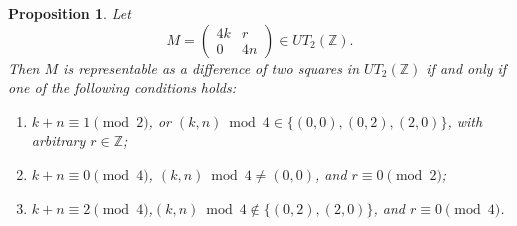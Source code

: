 \documentclass[11pt]{amsart}
\newtheorem{proposition}[theorem]{Proposition}
\def\Z{\mathbb{Z}}
\begin{document}
\begin{proposition}\label{prop:4k-4n-complete}
Let
$$M=\begin{pmatrix}4k&r\\0&4n\end{pmatrix}\in UT_2(\Z).$$
Then $M$ is representable as a difference of two squares in $UT_2(\Z)$ if and only if one of the following conditions holds:
\begin{enumerate}
\item $k+n\equiv1\pmod 2$, or $(k,n)\bmod 4\in\{(0,0),(0,2),(2,0)\}$, with arbitrary $r\in\mathbb Z$;
\item $k+n\equiv0\pmod 4$, $(k,n)\bmod 4\neq(0,0)$, and $r\equiv0\pmod 2$;
\item $k+n\equiv2\pmod 4$,$(k,n)\bmod 4\notin\{(0,2),(2,0)\}$, and $r\equiv0\pmod 4$.
\end{enumerate}
\end{proposition}
\end{document}
